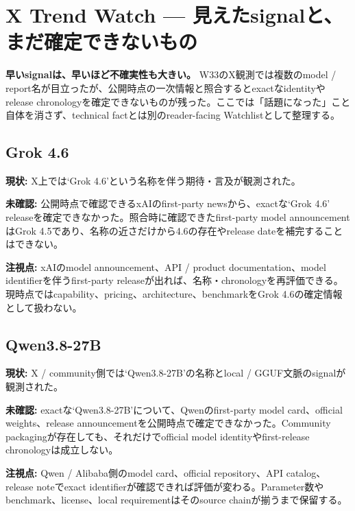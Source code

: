 \section{X Trend Watch --- 見えたsignalと、まだ確定できないもの}
\label{sec:x-trend-watch}

\textbf{早いsignalは、早いほど不確実性も大きい。} W33のX観測では複数のmodel / report名が目立ったが、公開時点の一次情報と照合するとexactなidentityやrelease chronologyを確定できないものが残った\cite{w33-grok-r3-observation,w33-grok-r3-review}。ここでは「話題になった」こと自体を消さず、technical factとは別のreader-facing Watchlistとして整理する。

\subsection*{Grok 4.6}

\textbf{現状:} X上では`Grok 4.6'という名称を伴う期待・言及が観測された\cite{w33-grok-r3-observation}。

\textbf{未確認:} 公開時点で確認できるxAIのfirst-party newsから、exactな`Grok 4.6' releaseを確定できなかった。照合時に確認できたfirst-party model announcementはGrok 4.5であり、名称の近さだけから4.6の存在やrelease dateを補完することはできない\cite{xai-news-w33,w33-grok-r3-review}。

\textbf{注視点:} xAIのmodel announcement、API / product documentation、model identifierを伴うfirst-party releaseが出れば、名称・chronologyを再評価できる。現時点ではcapability、pricing、architecture、benchmarkをGrok 4.6の確定情報として扱わない。

\subsection*{Qwen3.8-27B}

\textbf{現状:} X / community側では`Qwen3.8-27B'の名称とlocal / GGUF文脈のsignalが観測された\cite{w33-grok-r3-observation,w33-grok-r3-review}。

\textbf{未確認:} exactな`Qwen3.8-27B'について、Qwenのfirst-party model card、official weights、release announcementを公開時点で確定できなかった。Community packagingが存在しても、それだけでofficial model identityやfirst-release chronologyは成立しない。

\textbf{注視点:} Qwen / Alibaba側のmodel card、official repository、API catalog、release noteでexact identifierが確認できれば評価が変わる。Parameter数やbenchmark、license、local requirementはそのsource chainが揃うまで保留する。

